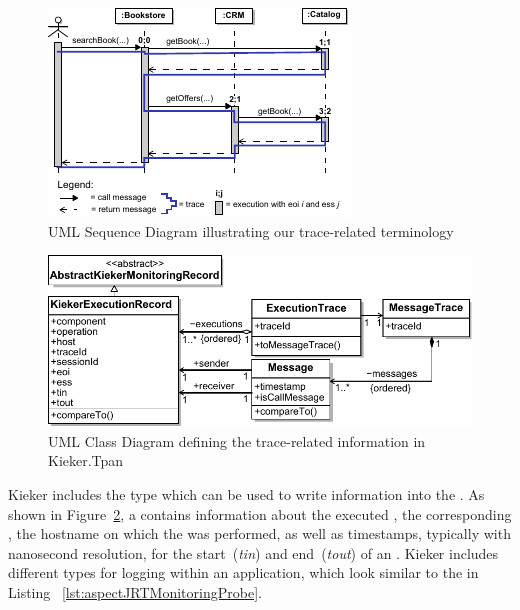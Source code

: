 \begin{figure}\centering
\includegraphics[width=0.96\columnwidth]{figures/eoiessBookstoreDemo-extended-2-combined}
\caption{UML Sequence Diagram illustrating our trace-related terminology}
\label{fig:exampleTraceTerminology}
\end{figure}

\begin{figure}\centering
\includegraphics[width=1\columnwidth]{figures/kiekerTraceRepresentations-refined-bw}%
\caption{UML Class Diagram defining the trace-related information in Kieker.Tpan}
\label{fig:kiekerTraceRepresentations}
\end{figure}

Kieker includes the \MonitoringRecord{} type \KiekerExecutionRecord{} which can %
be used to write \execution{} information into the \MonitoringLog{}. %
As shown in Figure~\ref{fig:kiekerTraceRepresentations}, a \KiekerExecutionRecord{} %
contains information about the executed \operation{}, the corresponding \component{}, 
the hostname on which the \execution{} was performed, as well as timestamps, %
typically with nanosecond resolution, for the start~(\textit{tin}) and end~(\textit{tout}) %
of an \execution{}. %
Kieker includes different \MonitoringProbe{} types for logging \KiekerExecutionRecords{} %
within an application, which look similar to the \MonitoringProbe{} in Listing~%
\ref{lst:aspectJRTMonitoringProbe}. %

